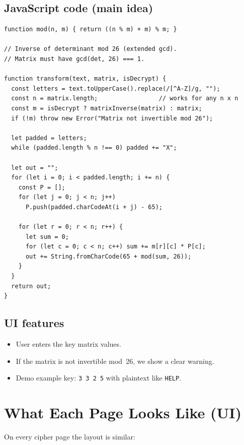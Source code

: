 \documentclass[12pt,a4paper]{article}
\begin{document}
\subsection{JavaScript code (main idea)}
\begin{lstlisting}
function mod(n, m) { return ((n % m) + m) % m; }

// Inverse of determinant mod 26 (extended gcd).
// Matrix must have gcd(det, 26) === 1.

function transform(text, matrix, isDecrypt) {
  const letters = text.toUpperCase().replace(/[^A-Z]/g, "");
  const n = matrix.length;                 // works for any n x n
  const m = isDecrypt ? matrixInverse(matrix) : matrix;
  if (!m) throw new Error("Matrix not invertible mod 26");

  let padded = letters;
  while (padded.length % n !== 0) padded += "X";

  let out = "";
  for (let i = 0; i < padded.length; i += n) {
    const P = [];
    for (let j = 0; j < n; j++)
      P.push(padded.charCodeAt(i + j) - 65);

    for (let r = 0; r < n; r++) {
      let sum = 0;
      for (let c = 0; c < n; c++) sum += m[r][c] * P[c];
      out += String.fromCharCode(65 + mod(sum, 26));
    }
  }
  return out;
}
\end{lstlisting}

\subsection{UI features}
\begin{itemize}[leftmargin=*]
  \item User enters the key matrix values.
  \item If the matrix is not invertible mod~26, we show a clear warning.
  \item Demo example key: \texttt{3 3 2 5} with plaintext like \texttt{HELP}.
\end{itemize}

\section{What Each Page Looks Like (UI)}

On every cipher page the layout is similar:
\end{document}
